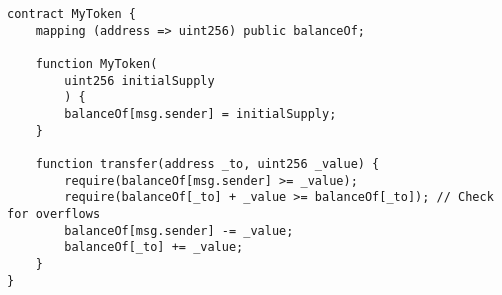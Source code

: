 \begin{lstlisting}[language=Solidity]
contract MyToken {
	mapping (address => uint256) public balanceOf;
	
	function MyToken(
		uint256 initialSupply
		) {
		balanceOf[msg.sender] = initialSupply;       
	}
	
	function transfer(address _to, uint256 _value) {
		require(balanceOf[msg.sender] >= _value);           
		require(balanceOf[_to] + _value >= balanceOf[_to]); // Check for overflows
		balanceOf[msg.sender] -= _value;                    
		balanceOf[_to] += _value;                           
	}
}
\end{lstlisting}